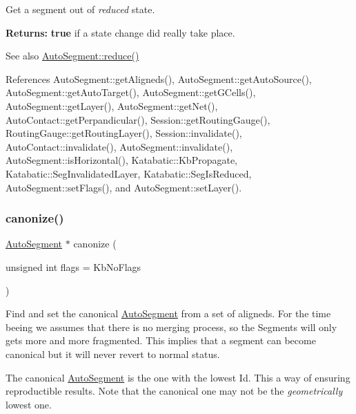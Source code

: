 Get a segment out of {\itshape reduced} state.

{\bfseries Returns\+:} {\bfseries true} if a state change did really take place.

\begin{DoxySeeAlso}{See also}
\hyperlink{classKatabatic_1_1AutoSegment_a27a6a2c747ff93d209878a32d97e9157}{Auto\+Segment\+::reduce()} 
\end{DoxySeeAlso}


References Auto\+Segment\+::get\+Aligneds(), Auto\+Segment\+::get\+Auto\+Source(), Auto\+Segment\+::get\+Auto\+Target(), Auto\+Segment\+::get\+G\+Cells(), Auto\+Segment\+::get\+Layer(), Auto\+Segment\+::get\+Net(), Auto\+Contact\+::get\+Perpandicular(), Session\+::get\+Routing\+Gauge(), Routing\+Gauge\+::get\+Routing\+Layer(), Session\+::invalidate(), Auto\+Contact\+::invalidate(), Auto\+Segment\+::invalidate(), Auto\+Segment\+::is\+Horizontal(), Katabatic\+::\+Kb\+Propagate, Katabatic\+::\+Seg\+Invalidated\+Layer, Katabatic\+::\+Seg\+Is\+Reduced, Auto\+Segment\+::set\+Flags(), and Auto\+Segment\+::set\+Layer().

\mbox{\label{classKatabatic_1_1AutoSegment_a8b0d5044dce091d06b633848a6f8a66d}} 
\subsubsection{\texorpdfstring{canonize()}{canonize()}}
{\footnotesize\ttfamily \hyperlink{classKatabatic_1_1AutoSegment}{Auto\+Segment} $\ast$ canonize (\begin{DoxyParamCaption}\item[{unsigned int}]{flags = {\ttfamily KbNoFlags} }\end{DoxyParamCaption})}

Find and set the canonical \hyperlink{classKatabatic_1_1AutoSegment}{Auto\+Segment} from a set of aligneds. For the time beeing we assumes that there is no merging process, so the Segments will only gets more and more fragmented. This implies that a segment can become canonical but it will never revert to normal status.

The canonical \hyperlink{classKatabatic_1_1AutoSegment}{Auto\+Segment} is the one with the lowest {\ttfamily Id}. This a way of ensuring reproductible results. Note that the canonical one may not be the {\itshape geometrically} lowest one.

